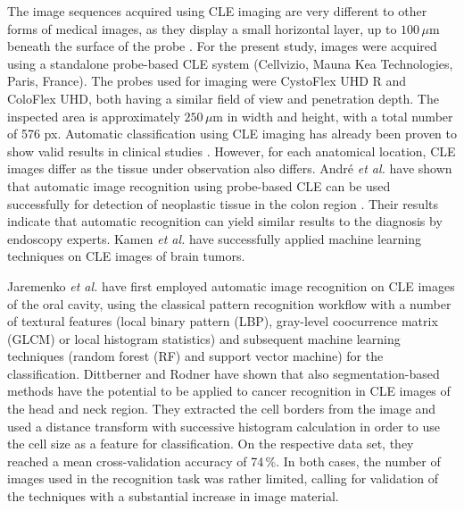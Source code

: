 \documentclass[fleqn,10pt]{wlscirep}
\begin{document}
The image sequences acquired using CLE imaging are very different to other
forms of medical images, as they display a small horizontal layer,
up to $100\,\mu$m beneath the surface of the probe \cite{Mennone:2017jj}. For the
present study, images were acquired using a standalone probe-based CLE
system (Cellvizio, Mauna Kea Technologies, Paris, France). The probes used for imaging were CystoFlex UHD R and ColoFlex UHD, both having a similar field of view and penetration depth. The
inspected area is approximately $250\,\mu $m in width and height, with
a total number of 576 px. Automatic classification
using CLE imaging has already been proven to show valid results in
clinical studies \cite{Andre:2012kw,Kamen:2016jw,Veronese:2013hb}. However, for each anatomical
location, CLE images differ as the tissue under observation also differs.  Andr\'{e} \textit{et al.} have shown that automatic image recognition
using probe-based CLE can be used successfully
for detection of neoplastic tissue in the colon region \cite{Andre:2012kw}. Their results
indicate that automatic recognition can yield similar results to the
diagnosis by endoscopy experts. Kamen \textit{et al.} have successfully applied machine learning techniques on CLE images of brain tumors. \cite{Kamen:2016jw}

Jaremenko \textit{et al.} have first employed automatic image recognition on CLE images
of the oral cavity, using the classical pattern recognition
workflow with a number of textural features (local binary pattern
(LBP), gray-level coocurrence matrix (GLCM) or local histogram
statistics) and subsequent machine
learning techniques (random forest (RF) and support vector machine)
for the classification\cite{Jaremenko:2015kh}. 
Dittberner \cite{Dittberner:2016jv} and Rodner \cite{Rodner:2015ts}
have shown that also segmentation-based methods have the
potential to be applied to cancer recognition in CLE images of the
head and neck region.  They extracted the cell borders from the image
and used a distance transform with successive histogram calculation in
order to use the cell size as a feature for classification. 
On the respective data set, they reached a mean cross-validation accuracy of
74\,\%\cite{Dittberner:2016jv}. 
In both cases, the number of images used in the
recognition task was rather limited, calling for validation of the
techniques with a substantial increase in image material. 
\end{document}
